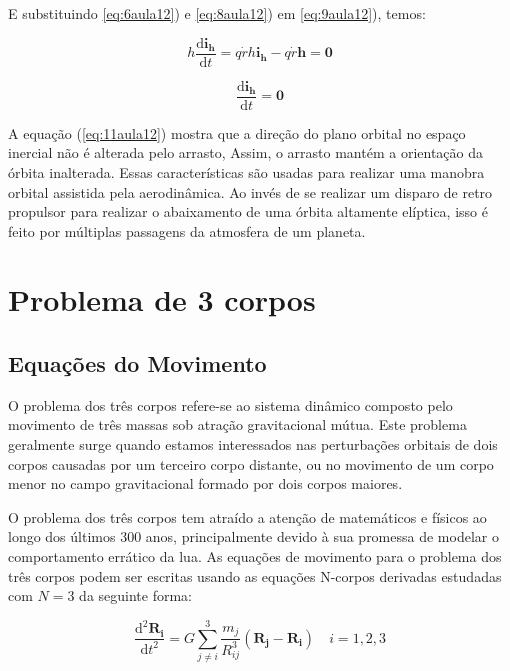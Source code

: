 E substituindo \ref{eq:6aula12}) e \ref{eq:8aula12}) em \ref{eq:9aula12}), temos:

\begin{equation}
h \frac{\mathrm{d} \mathbf{i}_{\mathbf{h}}}{\mathrm{d} t}=q \dot{r} h \mathbf{i}_{\mathbf{h}}-q \dot{r} \mathbf{h}=\mathbf{0}
\label{eq:10aula12}
\end{equation}

\begin{equation}
\frac{\mathrm{d} \mathbf{i}_{\mathbf{h}}}{\mathrm{d} t}=\mathbf{0}
\label{eq:11aula12}
\end{equation}

\par A equação (\ref{eq:11aula12}) mostra que a direção do plano orbital no espaço inercial não é alterada pelo arrasto, Assim, o arrasto mantém a orientação da órbita inalterada. Essas características são usadas para realizar uma manobra orbital assistida pela aerodinâmica. Ao invés de se realizar um disparo de retro propulsor para realizar o abaixamento de uma órbita altamente elíptica, isso é feito por múltiplas passagens da atmosfera de um planeta.

\section{Problema de 3 corpos}

\subsection{Equações do Movimento}


\par O problema dos três corpos refere-se ao sistema dinâmico composto pelo movimento de três massas sob atração gravitacional mútua. Este problema geralmente surge quando estamos interessados nas perturbações orbitais de dois corpos causadas por um terceiro corpo distante, ou no movimento de um corpo menor no campo gravitacional formado por dois corpos maiores. 
\par O problema dos três corpos tem atraído a atenção de matemáticos e físicos ao longo dos últimos 300 anos, principalmente devido à sua promessa de modelar o comportamento errático da lua. As equações de movimento para o problema dos três corpos podem ser escritas usando as equações N-corpos derivadas estudadas com $N = 3$ da seguinte forma:

\begin{equation}
\frac{\mathrm{d}^2 \mathbf{R}_{\mathbf{i}}}{\mathrm{d} t^2}=G \sum_{j \neq i}^3 \frac{m_j}{R_{i j}^3}\left(\mathbf{R}_{\mathbf{j}}-\mathbf{R}_{\mathbf{i}}\right) \quad i=1,2,3
\label{eq:7.1T}
\end{equation}

